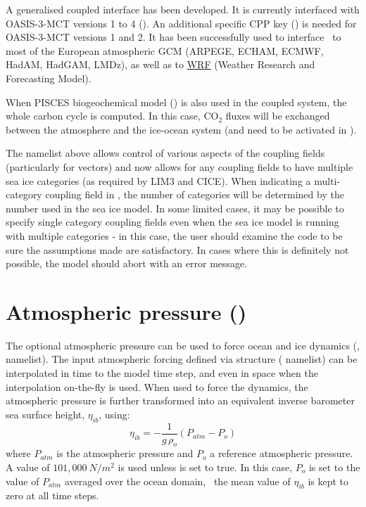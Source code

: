 \documentclass[../main/NEMO_manual]{subfiles}
\begin{document}
A generalised coupled interface has been developed.
It is currently interfaced with OASIS-3-MCT versions 1 to 4 ().
An additional specific CPP key () is needed for OASIS-3-MCT versions 1 and 2.
It has been successfully used to interface \NEMO\ to most of the European atmospheric GCM
(ARPEGE, ECHAM, ECMWF, HadAM, HadGAM, LMDz), as well as to \href{http://wrf-model.org/}{WRF}
(Weather Research and Forecasting Model).

When PISCES biogeochemical model () is also used in the coupled system,
the whole carbon cycle is computed.
In this case, CO$_2$ fluxes will be exchanged between the atmosphere and the ice-ocean system
(and need to be activated in  ).

The namelist above allows control of various aspects of the coupling fields (particularly for vectors) and
now allows for any coupling fields to have multiple sea ice categories (as required by LIM3 and CICE).
When indicating a multi-category coupling field in , the number of categories will be determined by
the number used in the sea ice model.
In some limited cases, it may be possible to specify single category coupling fields even when
the sea ice model is running with multiple categories -
in this case, the user should examine the code to be sure the assumptions made are satisfactory.
In cases where this is definitely not possible, the model should abort with an error message.

\section[Atmospheric pressure (\textit{sbcapr.F90})]{Atmospheric pressure (\protect{})}
\label{sec:SBC_apr}

\begin{listing}
  \caption{}
  \label{lst:namsbc_apr}
\end{listing}

The optional atmospheric pressure can be used to force ocean and ice dynamics
(,  namelist).
The input atmospheric forcing defined via  structure ( namelist)
can be interpolated in time to the model time step, and even in space when the interpolation on-the-fly is used.
When used to force the dynamics, the atmospheric pressure is further transformed into
an equivalent inverse barometer sea surface height, $\eta_{ib}$, using:
\[
  \eta_{ib} = -  \frac{1}{g\,\rho_o}  \left( P_{atm} - P_o \right)
\]
where $P_{atm}$ is the atmospheric pressure and $P_o$ a reference atmospheric pressure.
A value of $101,000~N/m^2$ is used unless  is set to true.
In this case, $P_o$ is set to the value of $P_{atm}$ averaged over the ocean domain,
\ie\ the mean value of $\eta_{ib}$ is kept to zero at all time steps.
\end{document}
